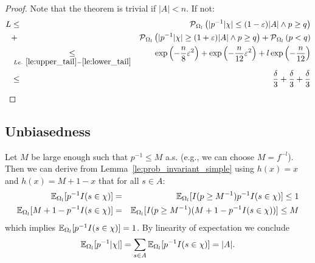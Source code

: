 \begin{proof}
Note that the theorem is trivial if $|A| < n$. If not:
\begin{eqnarray*}
  L & \leq & \operatorname{\mathcal P}_{\Omega_l} \left( | p^{-1} |\chi| \leq (1-\varepsilon) |A| \wedge p \geq q \right)\\
  & + &
    \operatorname{\mathcal P}_{\Omega_l} \left( | p^{-1} |\chi| \geq (1+\varepsilon) |A| \wedge p \geq q \right) +
    \operatorname{\mathcal P}_{\Omega_l} \left( p < q \right) \\
    & \underset{Le.~\ref{le:upper_tail}-\ref{le:lower_tail}}{\leq} &
    \exp\left( - \frac{n}{8} \varepsilon^2 \right)  + \exp\left( - \frac{n}{12} \varepsilon^2 \right) + 
    l \exp\left( - \frac{n}{12} \right) \\
    & \leq & \frac{\delta}{3} + \frac{\delta}{3} + \frac{\delta}{3}
\end{eqnarray*}
\end{proof}
\subsection{Unbiasedness\label{sec:unbiasedness}}
Let $M$ be large enough such that $p^{-1} \leq M$ a.s. (e.g., we can choose $M = f^{-l}$).
Then we can derive from Lemma~\ref{le:prob_invariant_simple} using $h(x) = x$ and $h(x) = M+1-x$ that
for all $s \in A$:
\begin{eqnarray*}
  \operatorname{\mathbb E}_{\Omega_l} [ p^{-1} I(s \in \chi) ] & = &
    \operatorname{\mathbb E}_{\Omega_l} [ I(p \geq M^{-1}) p^{-1} I(s \in \chi) ] \leq 1 \\
  \operatorname{\mathbb E}_{\Omega_l} [ M + 1 - p^{-1} I(s \in \chi) ] & = &
    \operatorname{\mathbb E}_{\Omega_l} [ I(p \geq M^{-1}) (M + 1 - p^{-1} I(s \in \chi)) ] \leq M
\end{eqnarray*}
which implies $\operatorname{\mathbb E}_{\Omega_l} [ p^{-1} I(s \in \chi) ] = 1$.
By linearity of expectation we conclude
\[
  \operatorname{\mathbb E}_{\Omega_l} [ p^{-1} |\chi| ] =
    \sum_{s \in A} \operatorname{\mathbb E}_{\Omega_l} [ p^{-1} I(s \in \chi) ] = |A| \textrm{.}
\]
